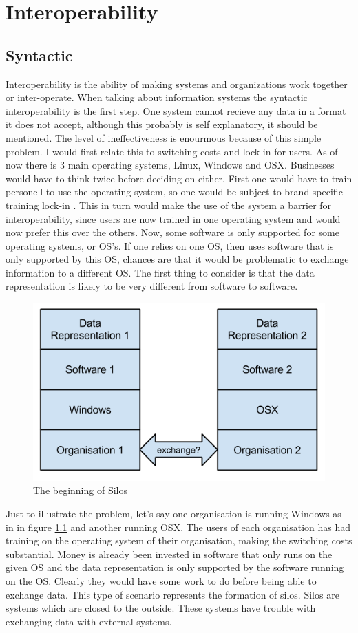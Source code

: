 \chapter{Interoperability}
\section{Syntactic}
Interoperability is the ability of making systems and organizations work together or inter-operate. When talking about information systems the syntactic interoperability is the first step.
One system cannot recieve any data in a format it does not accept, although this probably is self explanatory, it should be mentioned.
The level of ineffectiveness is enourmous because of this simple problem. I would first relate this to switching-costs and lock-in for users. As of now there is 3 main operating systems, Linux, Windows and OSX. Businesses would have to think twice before deciding on either. First one would have to train personell to use the operating system, so one would be subject to brand-specific-training lock-in \cite{15}. This in turn would make the use of the system a barrier for interoperability, since users are now trained in one operating system and would now prefer this over the others. Now, some software is only supported for some operating systems, or OS's. If one relies on one OS, then uses software that is only supported by this OS, chances are that it would be problematic to exchange information to a different OS. The first thing to consider is that the data representation is likely to be very different from software to software. 
\begin{figure}
\centering
\includegraphics[width=12cm]{litterature/images/begin_silo}
\caption{The beginning of Silos}
\label{begin_silo}
\end{figure}
Just to illustrate the problem, let's say one organisation is running Windows as in in figure \ref{begin_silo} and another running OSX. The users of each organisation has had training on the operating system of their organisation, making the switching costs substantial. Money is already been invested in software that only runs on the given OS and the data representation is only supported by the software running on the OS. Clearly they would have some work to do before being able to exchange data. This type of scenario represents the formation of silos. Silos are systems which are closed to the outside. These systems have trouble with exchanging data with external systems. 

